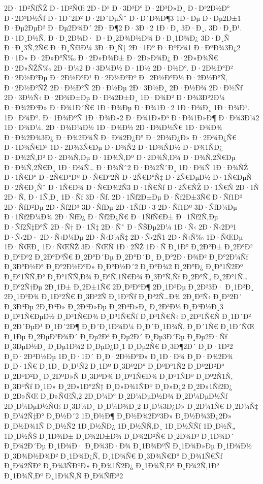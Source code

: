 {2Ð·1Ð²ÑƒÑŽ
Ð·1Ð²ÑŒ
2Ð·Ð³
Ð·3Ð³Ð°
Ð·2Ð³Ð»Ð¸
Ð·Ð³2Ð½Ð°
Ð·2Ð³Ð½Ñƒ
Ð·1Ð´2Ð²
Ð·2Ð´ÐµÑˆ
Ð·Ð´Ð¾Ð¶3
1Ð·Ðµ
Ð·Ðµ2Ð±1
Ð·Ðµ2ÐµÐ²
Ð·Ðµ2Ð¾Ð´
2Ð·Ð¶2
Ð·3Ð·2
1Ð·Ð¸
3Ð·Ð¸.
3Ð·Ð¸Ð¹.
Ð·1Ð¸Ð½Ñ‚
Ð·Ð¸2Ð¾Ð·
Ð·Ð¸2Ð¾Ð½Ð¾
Ð·Ð¸1Ð¾Ð¿
3Ð·Ð¸Ñ
Ð·Ð¸3Ñ‚2Ñ€
Ð·Ð¸Ñƒ3Ð¼
3Ð·Ð¸Ñ‡
2Ð·1Ðº
Ð·ÐºÐ¾1
Ð·ÐºÐ¾3Ð¿2
Ð·1Ð»
Ð·2Ð»Ð°Ñ‰
Ð·2Ð»Ð¾Ð±
Ð·2Ð»Ð¾Ð¿
Ð·2Ð»Ð¾Ñ€
Ð·2Ð»ÑŽÑ‰
2Ð·Ð¼2
Ð·3Ð¼Ð½
Ð·1Ð½
2Ð·Ð½Ð°.
Ð·2Ð½Ð°Ð²
Ð·2Ð½Ð°Ðµ
Ð·2Ð½Ð°Ð¹
Ð·2Ð½Ð°Ðº
Ð·2Ð½Ð°Ð½
Ð·2Ð½Ð°Ñ‚
Ð·2Ð½Ð°ÑŽ
2Ð·Ð½Ð°Ñ
2Ð·Ð½Ðµ
2Ð·3Ð½Ð¸
2Ð·Ð½Ð¾
2Ð·Ð½Ñƒ
2Ð·3Ð½Ñ‹
Ð·2Ð¾Ð±Ðµ
Ð·Ð¾2Ð±Ð¸
1Ð·Ð¾Ð²
Ð·Ð¾3Ð²2Ð¼
Ð·Ð¾2Ð³Ð»
Ð·Ð¾1Ð´Ñ€
1Ð·Ð¾Ðµ
Ð·Ð¾1Ð·2
1Ð·Ð¾Ð¸
1Ð·Ð¾Ð¹.
1Ð·Ð¾Ðº.
Ð·1Ð¾ÐºÑ
1Ð·Ð¾Ð»2
Ð·Ð¾1Ð»Ð³
Ð·Ð¾1Ð»Ð¶
Ð·Ð¾3Ð¼2
1Ð·Ð¾Ð¼.
2Ð·Ð¾Ð¼Ð½
1Ð·Ð¾Ð½
2Ð·Ð¾Ð½Ñ€
1Ð·Ð¾Ð¾
Ð·Ð¾2Ð¾3Ð¿
Ð·Ð¾2Ð¾Ñ
Ð·Ð¾2Ð¿Ð°
Ð·2Ð¾Ð¿Ð»
Ð·2Ð¾Ð¿Ñ€
Ð·1Ð¾Ñ€Ð³
1Ð·2Ð¾3Ñ€Ðµ
Ð·Ð¾Ñ2
Ð·1Ð¾ÑÐ½
Ð·Ð¾1ÑÐ¿
Ð·Ð¾2Ñ‚Ð²
Ð·2Ð¾Ñ‚Ðµ
Ð·1Ð¾Ñ‚Ðº
Ð·2Ð¾Ñ‚Ð¾
Ð·Ð¾Ñ‚2Ñ€Ðµ
Ð·Ð¾Ñ‚2Ñ€Ð¸
1Ð·Ð¾Ñ…
Ð·Ð¾Ñˆ2
Ð·Ð¾2ÑˆÐ¸
1Ð·Ð¾Ñ
1Ð·Ð¾ÑŽ
Ð·1Ñ€Ð°
Ð·2Ñ€Ð°Ðº
Ð·Ñ€Ð°2Ñ
Ð·2Ñ€Ð°Ñ‡
Ð·2Ñ€ÐµÐ½
Ð·1Ñ€ÐµÑ
Ð·2Ñ€Ð¸Ñˆ
Ð·1Ñ€Ð¾
Ð·Ñ€Ð¾2Ñ3
Ð·1Ñ€Ñƒ
Ð·2Ñ€ÑŽ
Ð·1Ñ€Ñ
2Ð·1Ñ
2Ð·Ñ‚
Ð·1Ñ‚Ð¸
1Ð·Ñƒ
3Ð·Ñƒ.
2Ð·1Ñƒ2Ð±Ðµ
Ð·Ñƒ2Ð±3Ñ€
Ð·Ñƒ1Ð²
2Ð·ÑƒÐ²Ðµ
2Ð·Ñƒ2Ð³
3Ð·ÑƒÐµ
2Ð·1ÑƒÐ·3
2Ð·Ñƒ1Ðº
3Ð·ÑƒÐ¼Ðµ
Ð·1Ñƒ2Ð¼Ð¾
2Ð·ÑƒÐ¿
Ð·Ñƒ2Ð¿Ñ€
Ð·1ÑƒÑ€Ð±
Ð·1Ñƒ2Ñ‚Ðµ
Ð·Ñƒ2Ñ‡Ð°Ñ
2Ð·Ñ†
Ð·1Ñ‡
2Ð·Ñˆ
Ð·ÑŠÐµ2Ð¼
1Ð·Ñ‹
2Ð·Ñ‹2Ð³1
Ð·Ñ‹2Ð·
2Ð·Ñ‹Ð¼Ðµ
2Ð·Ñ‹Ð¼Ñ‡
2Ð·Ñ‹2Ñ1
2Ð·Ñ‹Ñ‰
1Ð·ÑŒÐµ
1Ð·ÑŒÐ¸
1Ð·ÑŒÑŽ
3Ð·ÑŒÑ
1Ð·2ÑŽ
1Ð·Ñ
Ð¸1Ð°
Ð¸2Ð°Ð±
Ð¸2Ð°Ð²
Ð¸Ð°Ð³2
Ð¸2Ð°Ð³Ñ€
Ð¸2Ð°Ð´Ðµ
Ð¸2Ð°Ð´Ð¸
Ð¸Ð°2Ð·Ð¾Ð²
Ð¸Ð°2Ð¼Ñƒ
Ð¸3Ð°Ð½Ð°
Ð¸Ð°2Ð½Ð°Ð»
Ð¸Ð°Ð½Ð´2
Ð¸Ð°Ð¾2
Ð¸2Ð°Ð¿
Ð¸Ð°1Ñ2Ðº
Ð¸Ð°1ÑÑ‚Ð°
Ð¸Ð°1ÑÑ‚Ð¾
Ð¸Ð°Ñ‚1Ñ€Ð¾
Ð¸3Ð°Ñ‚Ñƒ
Ð¸2Ð°Ñ„
Ð¸2Ð°1Ñ…
Ð¸Ð°2Ñ†Ðµ
2Ð¸1Ð±
Ð¸2Ð±1Ñ€
2Ð¸Ð²Ð°Ð¶
2Ð¸1Ð²Ðµ
Ð¸2Ð²3Ð·
Ð¸1Ð²Ð¸
2Ð¸1Ð²Ð¾
Ð¸1Ð²2Ñ€
Ð¸3Ð²2Ñ
Ð¸1Ð²Ñƒ
Ð¸Ð²2Ñ…Ð¾
2Ð¸Ð²Ñ‹
Ð¸Ð³2Ð´
Ð¸3Ð³Ðµ
2Ð¸Ð³Ð»
Ð¸2Ð³Ð»Ðµ
Ð¸2Ð³Ð»Ð¸
Ð¸2Ð³Ð½
Ð¸Ð³Ð½Ð¸3
Ð¸Ð³1Ñ€ÐµÐ½
Ð¸Ð³1Ñ€Ð¾
Ð¸Ð³1Ñ€Ñƒ
Ð¸Ð³1Ñ€Ñ‹
Ð¸2Ð³1Ñ€Ñ
Ð¸1Ð´Ð²
Ð¸2Ð´ÐµÐ¹
Ð¸1Ð´2Ð¶
Ð¸Ð´Ð¸1Ð¾Ð¼
Ð¸Ð´Ð¸1Ð¾Ñ‚
Ð¸Ð´1Ñ€
Ð¸1Ð´ÑŒ
Ð¸1Ðµ
Ð¸2ÐµÐ²Ð¾Ð´
Ð¸Ðµ2Ð³
Ð¸Ðµ2Ð´
Ð¸Ðµ3Ð´Ðµ
Ð¸Ðµ2Ð·Ñƒ
Ð¸3ÐµÐ½Ð¸
Ð¸Ðµ1Ð¾2
Ð¸ÐµÐ¿Ð¸1
Ð¸Ðµ2Ñ€
Ð¸3Ð¶2Ð´
Ð¸Ð·1Ð²2
Ð¸Ð·2Ð³Ð½Ðµ
1Ð¸Ð·1Ð´
Ð¸Ð·2Ð½Ð°Ð»
Ð¸1Ð·Ð¾
Ð¸Ð·Ð¾2Ð¾
Ð¸Ð·1Ñ€
Ð¸1Ð¸
Ð¸Ð¹Ñ2
Ð¸1Ðº
Ð¸3Ðº2Ð°
Ð¸ÐºÐ°1Ñ2
Ð¸Ðº2Ð²Ð°
Ð¸2ÐºÐ²Ð¸
Ð¸2ÐºÐ»Ñ
Ð¸3ÐºÐ¾
Ð¸Ðº1Ñ€Ð¾
Ð¸Ðº1ÑÐº
Ð¸Ðº2Ñ1Ñ‚
Ð¸3ÐºÑƒ
Ð¸1Ð»
Ð¸2Ð»1Ð°2Ñ†
Ð¸Ð»Ð¾1ÑÐº
Ð¸Ð»Ð¿2
Ð¸2Ð»1Ñƒ2Ð¿
Ð¸2Ð»ÑŒ
Ð¸Ð»ÑŒÑ‚2
2Ð¸Ð¼Ð°
Ð¸2Ð¼ÐµÐ½Ð¾
Ð¸2Ð¼ÐµÐ½Ñƒ
2Ð¸Ð¼ÐµÐ½ÑŒ
Ð¸3Ð¼Ð¸
Ð¸Ð¼Ð¾Ð¸2
Ð¸Ð¼3Ð¿Ð»
Ð¸2Ð¼1Ñ€
Ð¸2Ð¼Ñ‡
Ð¸Ð¼2Ñ‡Ð°
Ð¸Ð½Ð´2
1Ð¸Ð½Ð¶
Ð¸Ð½Ð¾2Ðº3Ð»
Ð¸Ð½Ð¾3Ð¿2Ð»
Ð¸Ð½Ð¾1Ñ
Ð¸Ð½Ñ2
1Ð¸Ð½ÑÐ¿
1Ð¸Ð½ÑÑ‚Ð¸
1Ð¸Ð½ÑÑƒ
1Ð¸Ð½Ñ„
1Ð¸Ð½ÑŠ
Ð¸1Ð¾Ð±
Ð¸Ð¾2Ð±Ð¾
Ð¸Ð¾2Ð²Ñ€
Ð¸2Ð¾Ð³
Ð¸1Ð¾Ð´
Ð¸Ð¾2Ð´Ðµ
Ð¸1Ð¾Ð·
Ð¸Ð¾3Ð·Ð¾
Ð¸1Ð¾ÐºÑ
Ð¸1Ð¾Ð»Ðµ
Ð¸1Ð¾Ð½
Ð¸3Ð¾Ð½Ð¾Ð²
Ð¸1Ð¾Ð¿Ñ‚
Ð¸1Ð¾Ñ€
Ð¸3Ð¾Ñ€Ð°
Ð¸Ð¾1Ñ€Ñƒ
Ð¸Ð¾2ÑÐ°
Ð¸Ð¾3ÑÐºÐ»
Ð¸Ð¾1Ñ2Ð¿
Ð¸1Ð¾Ñ‚Ð°
Ð¸Ð¾2Ñ‚1Ð²
Ð¸1Ð¾Ñ‚Ðº
Ð¸1Ð¾Ñ‚Ñ
Ð¸Ð¾ÑƒÐ³2
}
